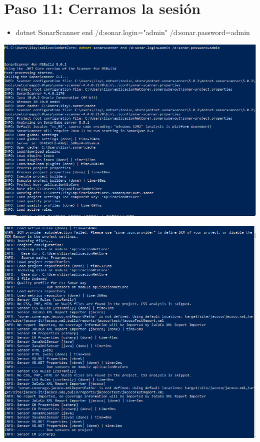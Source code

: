 \section{Paso 11: Cerramos la sesión } 
\begin{itemize}
    \item dotnet SonarScanner end /d:sonar.login="admin" /d:sonar.password=admin
\end{itemize}
\begin{center}
\includegraphics[width=\columnwidth]{images/15}\newline
\end{center}
\begin{center}
\includegraphics[width=\columnwidth]{images/16}\newline
\end{center}
